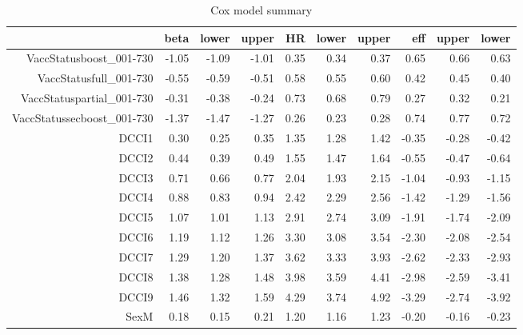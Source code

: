 \begin{table}[ht]
\centering
\begin{tabular}{rrrrrrrrrr}
  \hline
 & beta & lower & upper & HR & lower & upper & eff & upper & lower \\ 
  \hline
VaccStatusboost\_001-730 & -1.05 & -1.09 & -1.01 & 0.35 & 0.34 & 0.37 & 0.65 & 0.66 & 0.63 \\ 
  VaccStatusfull\_001-730 & -0.55 & -0.59 & -0.51 & 0.58 & 0.55 & 0.60 & 0.42 & 0.45 & 0.40 \\ 
  VaccStatuspartial\_001-730 & -0.31 & -0.38 & -0.24 & 0.73 & 0.68 & 0.79 & 0.27 & 0.32 & 0.21 \\ 
  VaccStatussecboost\_001-730 & -1.37 & -1.47 & -1.27 & 0.26 & 0.23 & 0.28 & 0.74 & 0.77 & 0.72 \\ 
  DCCI1 & 0.30 & 0.25 & 0.35 & 1.35 & 1.28 & 1.42 & -0.35 & -0.28 & -0.42 \\ 
  DCCI2 & 0.44 & 0.39 & 0.49 & 1.55 & 1.47 & 1.64 & -0.55 & -0.47 & -0.64 \\ 
  DCCI3 & 0.71 & 0.66 & 0.77 & 2.04 & 1.93 & 2.15 & -1.04 & -0.93 & -1.15 \\ 
  DCCI4 & 0.88 & 0.83 & 0.94 & 2.42 & 2.29 & 2.56 & -1.42 & -1.29 & -1.56 \\ 
  DCCI5 & 1.07 & 1.01 & 1.13 & 2.91 & 2.74 & 3.09 & -1.91 & -1.74 & -2.09 \\ 
  DCCI6 & 1.19 & 1.12 & 1.26 & 3.30 & 3.08 & 3.54 & -2.30 & -2.08 & -2.54 \\ 
  DCCI7 & 1.29 & 1.20 & 1.37 & 3.62 & 3.33 & 3.93 & -2.62 & -2.33 & -2.93 \\ 
  DCCI8 & 1.38 & 1.28 & 1.48 & 3.98 & 3.59 & 4.41 & -2.98 & -2.59 & -3.41 \\ 
  DCCI9 & 1.46 & 1.32 & 1.59 & 4.29 & 3.74 & 4.92 & -3.29 & -2.74 & -3.92 \\ 
  SexM & 0.18 & 0.15 & 0.21 & 1.20 & 1.16 & 1.23 & -0.20 & -0.16 & -0.23 \\ 
   \hline
\end{tabular}
\caption{Cox model summary} 
\end{table}

